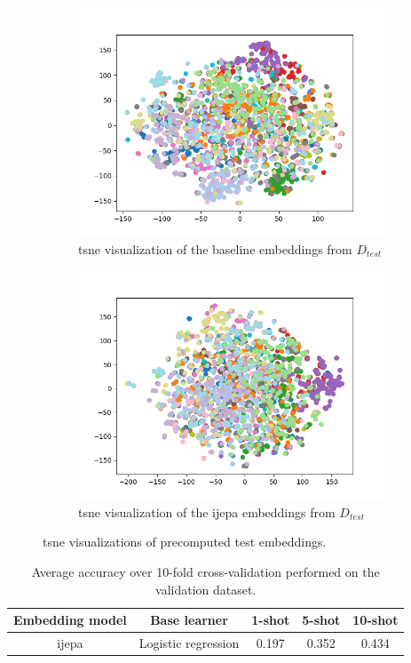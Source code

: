 \begin{figure}[ht!]
	\begin{subfigure}[t]{.4\linewidth}
		\centering
		\includegraphics[width=1\linewidth]{images/2d_base_test_scatter.png} 
		\caption{\gls{tsne} visualization of the baseline embeddings from $D_{test}$}
	\end{subfigure}
	\hfill
	\begin{subfigure}[t]{.4\linewidth}
		\centering
		\includegraphics[width=1\linewidth]{images/2d_test_scatter.png} 
		\caption{\gls{tsne} visualization of the \gls{ijepa} embeddings from $D_{test}$}
	\end{subfigure}
	\caption{\gls{tsne} visualizations of precomputed test embeddings.}
\end{figure}
\label{fig:tsne_embeddings_test}

\begin{table}[ht!]
\centering
\begin{tabular}{ c c c c c }
	\hline
	\textbf{Embedding model} & \textbf{Base learner} & \textbf{1-shot} & \textbf{5-shot} & \textbf{10-shot} \\
	\hline
	\gls{ijepa} & Logistic regression & 0.197 & 0.352 & 0.434 \\
	\hline
\end{tabular}
\caption{Average accuracy over 10-fold cross-validation performed on the validation dataset.}
\label{table:test}
\end{table}
